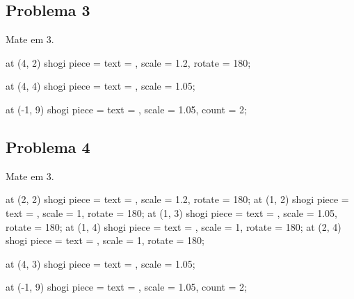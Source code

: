 \documentclass[14pt]{extarticle}
\renewcommand{\_}{\leavevmode\kern.06em\vbox{\hrule width.425em}}
\newenvironment{shogiBigProblem}[1][]{%
  \hbox\bgroup
    \hspace{-1.5cm}
    \begin{shogiban}[%
      board dimension = 12.5 cm,
      font scale = 2.5,
      #1,
    ]
}{
    \end{shogiban}
  \egroup
}
\begin{document}
  \pagebreak

  \subsection{Problema 3}


  \vspace{0.5cm}

  Mate em 3. 

  \vspace{1.5cm}

  \begin{shogiBigProblem}
    \pic at (4, 2) {shogi piece = {text = \shogiKingGote, scale = 1.2, rotate = 180}};

    \pic at (4, 4) {shogi piece = {text = \shogiSilver, scale = 1.05}};

    \pic at (-1, 9) {shogi piece = {text = \shogiGold, scale = 1.05, count = 2}};
  \end{shogiBigProblem}
  
  \pagebreak

  \subsection{Problema 4}


  \vspace{0.5cm}

  Mate em 3. 

  \vspace{1.5cm}

  \begin{shogiBigProblem}
    \pic at (2, 2) {shogi piece = {text = \shogiKingGote, scale = 1.2, rotate = 180}};
    \pic at (1, 2) {shogi piece = {text = \shogiLance, scale = 1, rotate = 180}};
    \pic at (1, 3) {shogi piece = {text = \shogiSilver, scale = 1.05, rotate = 180}};
    \pic at (1, 4) {shogi piece = {text = \shogiPawn, scale = 1, rotate = 180}};
    \pic at (2, 4) {shogi piece = {text = \shogiPawn, scale = 1, rotate = 180}};

    \pic at (4, 3) {shogi piece = {text = \shogiGold, scale = 1.05}};

    \pic at (-1, 9) {shogi piece = {text = \shogiGold, scale = 1.05, count = 2}};
  \end{shogiBigProblem}
  
\end{document}
